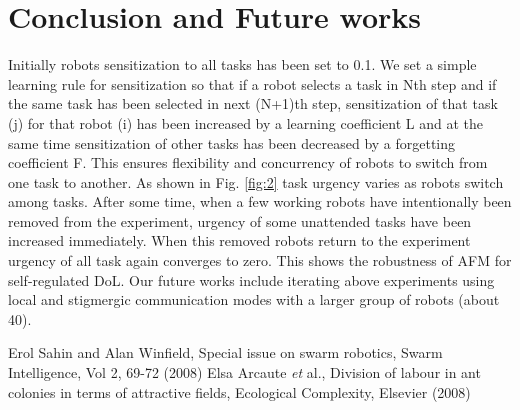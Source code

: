 \documentclass{llncs}
\begin{document}
\section{Conclusion and Future works}
\label{sec:conc}
 Initially robots sensitization to all tasks has been set to 0.1. We set a simple learning rule for sensitization so that if a robot selects a task in Nth step and if the same task has been selected in next (N+1)th step, sensitization of that task (j) for that robot (i) has been increased by a learning coefficient L and at the same time sensitization of other tasks has been decreased by a forgetting coefficient F. This ensures flexibility and concurrency of robots to switch from one task to another.
%
As shown in Fig. \ref{fig:2} task urgency varies as robots switch among tasks. %
%
After some time, when a few working robots have intentionally been removed from the experiment, urgency of some unattended tasks have been increased immediately. When this removed robots return to the experiment urgency of all task again converges to zero. This shows the robustness of AFM for self-regulated DoL. %
%
Our future works include iterating above experiments using local and stigmergic communication modes with a larger group of robots (about 40). %
\begin{thebibliography}{}
%
%
Erol Sahin and Alan Winfield, Special issue on swarm robotics, Swarm Intelligence, Vol 2, 69-72 (2008)
Elsa Arcaute \textit{et} al., Division of labour in ant colonies in terms of attractive fields, Ecological Complexity, Elsevier (2008)
\end{thebibliography}
%
\end{document}
